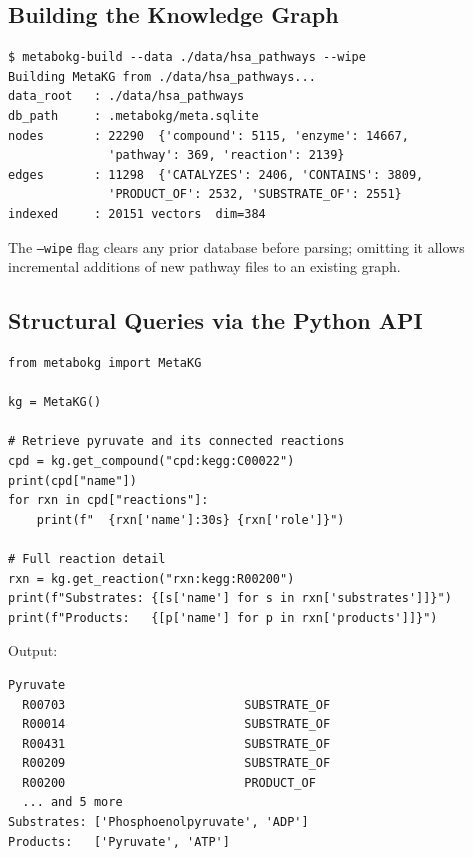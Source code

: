 \documentclass[10pt]{article}
\begin{document}
\subsection{Building the Knowledge Graph}

\begin{lstlisting}[style=bash, caption={Building the complete human metabolome knowledge graph.}]
$ metabokg-build --data ./data/hsa_pathways --wipe
Building MetaKG from ./data/hsa_pathways...
data_root   : ./data/hsa_pathways
db_path     : .metabokg/meta.sqlite
nodes       : 22290  {'compound': 5115, 'enzyme': 14667,
              'pathway': 369, 'reaction': 2139}
edges       : 11298  {'CATALYZES': 2406, 'CONTAINS': 3809,
              'PRODUCT_OF': 2532, 'SUBSTRATE_OF': 2551}
indexed     : 20151 vectors  dim=384
\end{lstlisting}

The \texttt{--wipe} flag clears any prior database before parsing; omitting it
allows incremental additions of new pathway files to an existing graph.

\subsection{Structural Queries via the Python API}

\begin{lstlisting}[style=python, caption={Compound retrieval and neighbourhood traversal.}]
from metabokg import MetaKG

kg = MetaKG()

# Retrieve pyruvate and its connected reactions
cpd = kg.get_compound("cpd:kegg:C00022")
print(cpd["name"])
for rxn in cpd["reactions"]:
    print(f"  {rxn['name']:30s} {rxn['role']}")

# Full reaction detail
rxn = kg.get_reaction("rxn:kegg:R00200")
print(f"Substrates: {[s['name'] for s in rxn['substrates']]}")
print(f"Products:   {[p['name'] for p in rxn['products']]}")
\end{lstlisting}

Output:
\begin{lstlisting}[style=bash, caption={}]
Pyruvate
  R00703                         SUBSTRATE_OF
  R00014                         SUBSTRATE_OF
  R00431                         SUBSTRATE_OF
  R00209                         SUBSTRATE_OF
  R00200                         PRODUCT_OF
  ... and 5 more
Substrates: ['Phosphoenolpyruvate', 'ADP']
Products:   ['Pyruvate', 'ATP']
\end{lstlisting}
\end{document}
